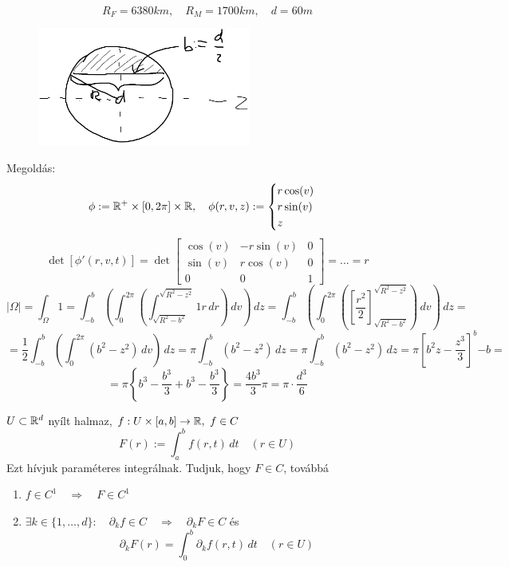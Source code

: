 \documentclass[a4paper,11.5pt]{article}
\begin{document}
	\begin{task}
		\[ R_F=6380km,\quad R_M=1700km,\quad d=60m \]
		\begin{figure}[h]
			\centering
			\includegraphics[width=7cm]{kepek/05.png}
			\caption{}
		\end{figure}
		
		Megoldás:
		\[ \phi:=\mathbb{R}^+\times[0,2\pi]\times\mathbb{R},\quad \phi(r,v,z):=\begin{cases}
			r\cos(v)\\
			r\sin(v)\\
			z
		\end{cases}\]\[ \det[\phi'(r,v,t)]=\det \begin{bmatrix}
			\cos(v)&-r\sin(v)&0\\
			\sin(v)&r\cos(v)&0\\
			0&0&1
		\end{bmatrix}=...=r \]
		\[ |\varOmega|=\int_{\varOmega}^{}1=\int_{-b}^{b}\left(\int_{0}^{2\pi}\left(\int_{\sqrt{R^2-b^2}}^{\sqrt{R^2-z^2}}1r\,dr\right)\,dv\right)\,dz=\int_{-b}^{b}\left(\int_0^{2\pi}\left(\left[\frac{r^2}{2}\right]_{\sqrt{R^2-b^2}}^{\sqrt{R^2-z^2}} \right)\,dv\right)\,dz=\]
		\[=\frac{1}{2}\int_{-b}^{b}\left(\int_{0}^{2\pi}(b^2-z^2)\,dv\right)\,dz=\pi\int_{-b}^{b}(b^2-z^2)\,dz=\pi\int_{-b}^{b}(b^2-z^2)\,dz=\pi\left[b^2z-\frac{z^3}{3}\right]^b{-b}=\]
		\[=\pi\left\{ b^3-\frac{b^3}{3}+b^3-\frac{b^3}{3} \right\}=\frac{4b^3}{3}\pi=\pi\cdot\frac{d^3}{6} \]
	\end{task}
	\begin{revision}
		$U\subset\mathbb{R}^d$ nyílt halmaz, $f:U\times[a,b]\to\mathbb{R},\ f\in C$
		\[ F(r):=\int_{a}^{b}f(r,t)\,dt\quad (r\in U) \]
		Ezt hívjuk paraméteres integrálnak. Tudjuk, hogy $F\in C$, továbbá
		\begin{enumerate}
			\item $f\in C^1\quad \Rightarrow\quad F\in C^1$
			\item $\exists k\in\{1,\ldots,d\}:\quad \partial_k f\in C\quad \Rightarrow\quad \partial_k F\in C$ és 
			\[ \partial_k F(r)=\int_0^b \partial_k f(r,t)\,dt\quad (r\in U) \]
		\end{enumerate}
	\end{revision}
\end{document}

